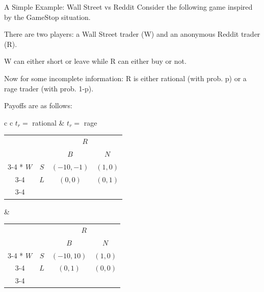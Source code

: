 \documentclass[aspectratio=169]{beamer}
\newenvironment{wideitemize}{\itemize\addtolength{\itemsep}{10pt}}{\enditemize}
\begin{document}
\begin{frame}{A Simple Example: Wall Street vs Reddit}
    Consider the following game inspired by the GameStop situation.
    \begin{wideitemize}
        \item There are two players: a Wall Street trader (W) and an anonymous Reddit trader (R).
        \item W can either short or leave while R can either buy or not.
        \item Now for some incomplete information: R is either rational (with prob. p) or a rage trader (with prob. 1-p).
        \item Payoffs are as follows:
    \end{wideitemize}
    
     \begin{table}
    \begin{tabular}{c c}
     $t_r=$ rational & $t_r=$ rage\\
    \begin{tabular}{cc|c|c|}
      & \multicolumn{1}{c}{} & \multicolumn{2}{c}{ $R$}\\
      & \multicolumn{1}{c}{} & \multicolumn{1}{c}{$B$}  & \multicolumn{1}{c}{$N$} \\\cline{3-4}
      \multirow{2}*{ $W$}  & $S$ & $(-10,-1)$ & $(1,0)$ \\\cline{3-4}
      & $L$ & $(0,0)$ & $(0,1)$ \\\cline{3-4}
    \end{tabular} &
   \begin{tabular}{cc|c|c|}
      & \multicolumn{1}{c}{} & \multicolumn{2}{c}{ $R$}\\
      & \multicolumn{1}{c}{} & \multicolumn{1}{c}{$B$}  & \multicolumn{1}{c}{$N$} \\\cline{3-4}
      \multirow{2}*{ $W$}  & $S$ & $(-10,10)$ & $(1,0)$ \\\cline{3-4}
      & $L$ & $(0,1)$ & $(0,0)$ \\\cline{3-4}
    \end{tabular}
   
      \end{tabular}
  \end{table}
\end{frame}
\end{document}
